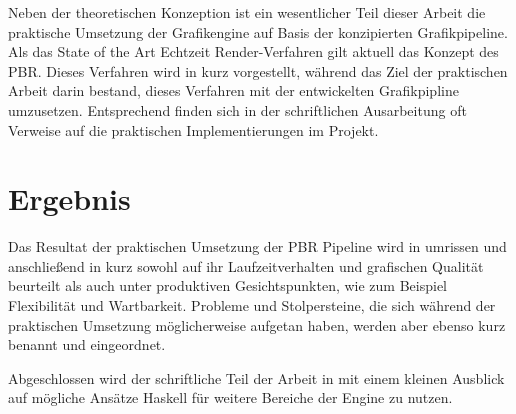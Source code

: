 Neben der theoretischen Konzeption ist ein wesentlicher Teil dieser Arbeit die praktische Umsetzung der Grafikengine auf Basis der konzipierten Grafikpipeline. Als das State of the Art Echtzeit Render-Verfahren gilt aktuell das Konzept des \ac{PBR}. Dieses Verfahren wird in  kurz vorgestellt, während das Ziel der praktischen Arbeit darin bestand, dieses Verfahren mit der entwickelten Grafikpipline umzusetzen. Entsprechend finden sich in der schriftlichen Ausarbeitung oft Verweise auf die praktischen Implementierungen im Projekt.

\section{Ergebnis}
Das Resultat der praktischen Umsetzung der \ac{PBR} Pipeline wird in  umrissen und anschließend in  kurz sowohl auf ihr Laufzeitverhalten und grafischen Qualität beurteilt als auch unter produktiven Gesichtspunkten, wie zum Beispiel Flexibilität und Wartbarkeit. Probleme und Stolpersteine, die sich während der praktischen Umsetzung möglicherweise aufgetan haben, werden aber ebenso kurz benannt und eingeordnet.

Abgeschlossen wird der schriftliche Teil der Arbeit in  mit einem kleinen Ausblick auf mögliche Ansätze Haskell für weitere Bereiche der Engine zu nutzen.
